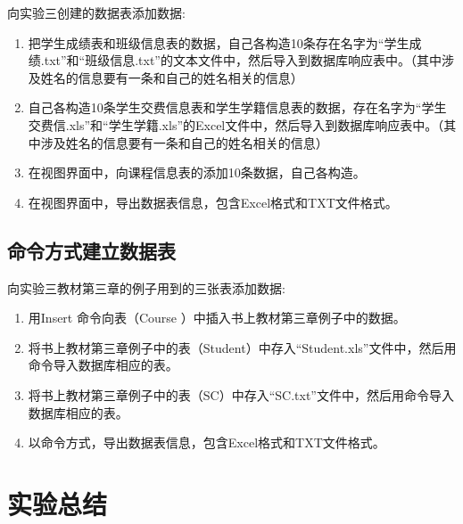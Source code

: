 \documentclass[a4paper,UTF8,heading=false,12pt]{article}
\begin{document}
    向实验三创建的数据表添加数据:
    \begin{enumerate}
        \item 把学生成绩表和班级信息表的数据，自己各构造10条存在名字为“学生成绩.txt”和“班级信息.txt”的文本文件中，然后导入到数据库响应表中。（其中涉及姓名的信息要有一条和自己的姓名相关的信息）
        \item 自己各构造10条学生交费信息表和学生学籍信息表的数据，存在名字为“学生交费信.xls”和“学生学籍.xls”的Excel文件中，然后导入到数据库响应表中。（其中涉及姓名的信息要有一条和自己的姓名相关的信息）
        \item 在视图界面中，向课程信息表的添加10条数据，自己各构造。
        \item 在视图界面中，导出数据表信息，包含Excel格式和TXT文件格式。
    \end{enumerate}

    \subsection{命令方式建立数据表}

    向实验三教材第三章的例子用到的三张表添加数据:

    \begin{enumerate}
        \item 用Insert 命令向表（Course ）中插入书上教材第三章例子中的数据。
        \item 将书上教材第三章例子中的表（Student）中存入“Student.xls”文件中，然后用命令导入数据库相应的表。
        \item 将书上教材第三章例子中的表（SC）中存入“SC.txt”文件中，然后用命令导入数据库相应的表。
        \item 以命令方式，导出数据表信息，包含Excel格式和TXT文件格式。
    \end{enumerate}

    \section{实验总结}
\end{document}
